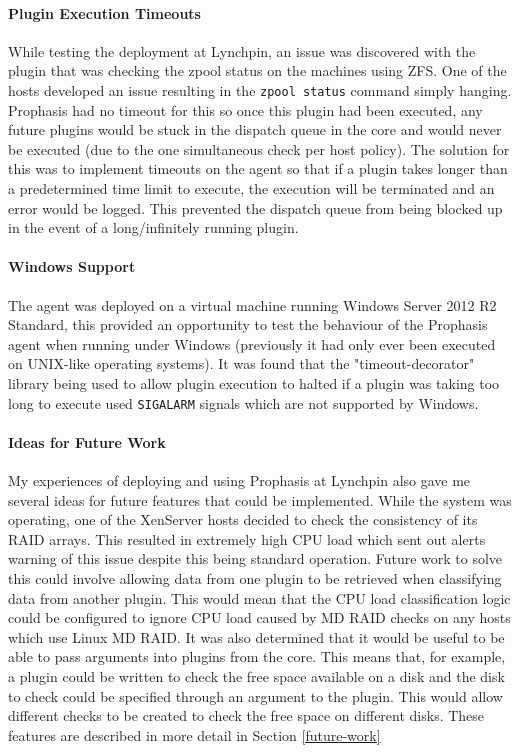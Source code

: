 \documentclass[bsc,logo,twoside,singlespacing,notimes]{infthesis}
\begin{document}
\paragraph*{Plugin Execution Timeouts}
	While testing the deployment at Lynchpin, an issue was discovered with the
	plugin that was checking the zpool status on the machines using ZFS. One of the
	hosts developed an issue resulting in the \texttt{zpool status} command simply
	hanging.  Prophasis had no timeout for this so once this plugin had been
	executed, any future plugins would be stuck in the dispatch queue in the core
	and would never be executed (due to the one simultaneous check per host
	policy).  The solution for this was to implement timeouts on the agent so that
	if a plugin takes longer than a predetermined time limit to execute, the
	execution will be terminated and an error would be logged.  This prevented
	the dispatch queue from being blocked up in the event of a long/infinitely
	running plugin.
	
\paragraph*{Windows Support}
	The agent was deployed on a virtual machine running Windows Server 2012 R2
	Standard, this provided an opportunity to test the behaviour of the Prophasis
	agent when running under Windows (previously it had only ever been executed on
	UNIX-like operating systems).  It was found that the "timeout-decorator"
	library being used to allow plugin execution to halted if a plugin was taking
	too long to execute used \texttt{SIGALARM} signals which are not supported by
	Windows. %
	
\paragraph*{Ideas for Future Work}
	My experiences of deploying and using Prophasis at Lynchpin also gave me
	several ideas for future features that could be implemented.  While the system
	was operating, one of the XenServer hosts decided to check the consistency of
	its RAID arrays.  This resulted in extremely high CPU load which sent out
	alerts warning of this issue despite this being standard operation. Future work
	to solve this could involve allowing data from one plugin to be retrieved when
	classifying data from another plugin. This would mean that the CPU load
	classification logic could be configured to ignore CPU load caused by MD RAID
	checks on any hosts which use Linux MD RAID. It was also determined that it
	would be useful to be able to pass arguments into plugins from the core.  This
	means that, for example, a plugin could be written to check the free space
	available on a disk and the disk to check could be specified through an
	argument to the plugin. This would allow different checks to be created to
	check the free space on different disks.  These features are described in more
	detail in Section \ref{future-work}
	
\end{document}
